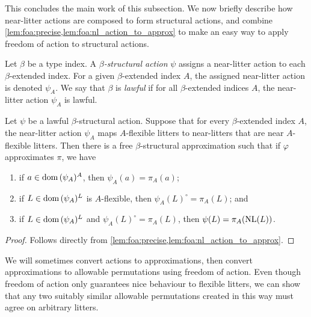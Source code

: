 This concludes the main work of this subsection.
We now briefly describe how near-litter actions are composed to form structural actions, and combine \cref{lem:foa:precise,lem:foa:nl_action_to_approx} to make an easy way to apply freedom of action to structural actions.

\begin{definition}
    Let \( \beta \) be a type index.
    A \emph{\( \beta \)-structural action} \( \psi \) assigns a near-litter action to each \( \beta \)-extended index.
    For a given \( \beta \)-extended index \( A \), the assigned near-litter action is denoted \( \psi_A \).
    We say that \( \beta \) is \emph{lawful} if for all \( \beta \)-extended indices \( A \), the near-litter action \( \psi_A \) is lawful.
\end{definition}

\begin{proposition}
    \label{lem:foa:struct_action_to_approx}
    Let \( \psi \) be a lawful \( \beta \)-structural action.
    Suppose that for every \( \beta \)-extended index \( A \), the near-litter action \( \psi_A \) maps \( A \)-flexible litters to near-litters that are near \( A \)-flexible litters.
    Then there is a free \( \beta \)-structural approximation such that if \( \varphi \) approximates \( \pi \), we have
    \begin{enumerate}
        \item if \( a \in \operatorname{dom}{(\psi_A)^A} \), then \( \psi_A(a) = \pi_A(a) \);
        \item if \( L \in \operatorname{dom}{(\psi_A)^L} \) is \( A \)-flexible, then \( \psi_A(L)^\circ = \pi_A(L) \); and
        \item if \( L \in \operatorname{dom}{(\psi_A)^L} \) and \( \psi_A(L)^\circ = \pi_A(L) \), then \( \psi(L) = \pi_A(\operatorname{NL}(L)) \).
    \end{enumerate}
\end{proposition}
\begin{proof}
    Follows directly from \cref{lem:foa:precise,lem:foa:nl_action_to_approx}.
\end{proof}

We will sometimes convert actions to approximations, then convert approximations to allowable permutations using freedom of action.
Even though freedom of action only guarantees nice behaviour to flexible litters, we can show that any two suitably similar allowable permutations created in this way must agree on arbitrary litters.

